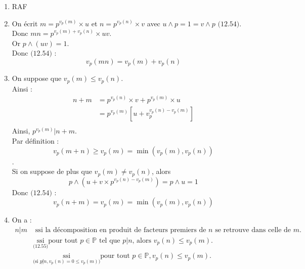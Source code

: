 \documentclass[../main.tex]{subfiles}
\begin{document}
\begin{enumerate}
    \item RAF
    
    \item On écrit $m = p^{v_p(m)} \times u$ et $n = p^{v_p(n)} \times v$ avec $u \wedge p = 1 = v \wedge p$ $\text{(12.54)}$. \\
    Donc $mn = p^{v_p(m) + v_p(n)} \times uv$. \\
    Or $p \wedge (uv) = 1$. \\
    Donc $\text{(12.54)}$ :
    $$\boxed{v_p(mn) = v_p(m) + v_p(n)}$$

    \item On suppose que $v_p(m) \leq v_p(n)$. \\
    Ainsi : 
    \begin{align*}
        n + m &= p^{v_p(n)} \times v + p^{v_p(m)} \times u \\
        &= p^{v_p(m)} \left[ u + v_p^{v_p(n) - v_p(m)} \right] \\
    \end{align*}
    Ainsi, $p^{v_p(m)} | n + m$. \\
    Par définition :
    $$\boxed{v_p(m + n) \geq v_p(m) = \min(v_p(m), v_p(n))}$$. \\
    Si on suppose de plus que $v_p(m) \neq v_p(n)$, alors 
    $$p \wedge (u + v \times p^{v_p(n) - v_p(m)}) = p \wedge u = 1$$
    Donc $\text{(12.54)}$ :
    $$\boxed{v_p(n + m) = v_p(m) = \min(v_p(m), v_p(n))}$$

    \item On a :
    \begin{align*}
        n|m &\text{ ssi } \text{la décomposition en produit de facteurs premiers de $n$ se retrouve dans celle de $m$. } \\
        &\underset{\text{(12.55)}}{\text{ ssi }} \text{pour tout $p \in \mathbb{P}$ tel que $p|n$, alors $v_p(n) \leq v_p(m)$. } \\
        &\underset{\text{(si $p \not | n, v_p(n) = 0 \leq v_p(m)$)}}{\text{ ssi }} \text{pour tout $\boxed{p \in \mathbb{P}, v_p(n) \leq v_p(m)}$. }
    \end{align*}


\end{enumerate}
\end{document}
